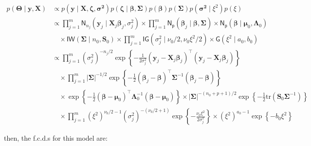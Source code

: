 \begin{equation}
\begin{split}
    \label{POST_HLRM}
    p(\bm{\Theta} \mid\bm{y}, \bm{X}) 
    &\propto p(\bm{y} \mid \bm{X}, \bm{\zeta} ,\bm{\sigma^2}) 
p(\bm{\zeta} \mid \bm{\beta}, \bm{\Sigma}) 
p(\bm{\beta}) 
p(\bm{\Sigma}) 
p(\bm{\sigma^2}\mid 
\xi^2)
p(\xi)\\
&\propto \prod_{j=1}^{m}\mathsf{N}_{n_j}(\bm{y}_{j}\mid\bm{X}_{j} \bm{\beta}_j,{\sigma}_j^2)\times\prod_{j=1}^{m}\mathsf{N_p}(\bm{\beta}_j \mid \bm{\beta}, \bm{\Sigma})\times\mathsf{N_p}(\bm{\beta}\mid\bm{\mu}_0, \bm{\Lambda}_0)\\
&\quad\times\mathsf{IW}\left(\bm{\Sigma}\mid n_0, \mathbf{S}_0\right)\times\prod_{j=1}^{m}\mathsf{IG}\left(\sigma_j^2 \mid\nu_0 / 2, \nu_0 \xi^2 / 2\right)\times\mathsf{G}\left(\xi^2 \mid a_0, b_0\right)\\
&\propto \prod_{j=1}^{m}  ({\sigma}_j^2)^{-n_j/2} 
\exp\left\{ -\frac{1}{2\sigma_j^2} (\bm{y}_{j} - \bm{X}_{j} \bm{\beta}_j)^\top(\bm{y}_{j} - \bm{X}_{j} \bm{\beta}_j) \right\} \\
&\quad\times \prod_{j=1}^{m} \left| \bm{\Sigma} \right|^{-1/2} 
\exp\left\{ -\frac{1}{2} (\bm{\beta}_j -  \bm{\beta})^\top \bm{\Sigma}^{-1} (\bm{\beta}_j - \bm{\beta}) \right\} \\
&\quad \times \exp\left\{ -\frac{1}{2} (\bm{\beta} - \bm{\mu}_0)^\top \bm{\Lambda}_0^{-1} (\bm{\beta} - \bm{\mu}_0) \right\}
\times |\bm{\Sigma}|^{-(n_0 + p + 1)/2} 
 \exp\left\{ -\frac{1}{2} \mathrm{tr}(\bm{S}_0 \bm{\Sigma}^{-1}) \right\} \\
&\quad \times \prod_{j=1}^{m} (\xi^2)^{\nu_0 / 2 - 1} 
(\sigma_j^2)^{-(\nu_0 / 2+1)} 
\exp\left\{ -\frac{\nu_0 \xi^2}{2 \sigma_j^2} \right\} 
\times (\xi^2)^{a_0 - 1} \exp\left\{ -b_0 \xi^2 \right\}
\end{split}
\end{equation}

then, the f.c.d.s for this model are:

